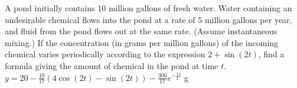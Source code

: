 {
	A pond initially contains 10 million gallons of fresh water.  Water containing an undesirable chemical flows into the pond at a rate of 5 million gallons per year, and fluid from the pond flows out at the same rate. (Assume instantaneous mixing.) If the concentration (in grams per million gallons) of the incoming chemical varies periodically according to the expression $2 + \sin(2t)$, find a formula giving the amount of chemical in the pond at time $t$.
}
{
$y = \displaystyle 20 - \frac{10}{17}\left (4\cos(2t)- \sin(2t)\right) - \frac{300}{17}e^{-\frac{1}{2}t}$ g
}
